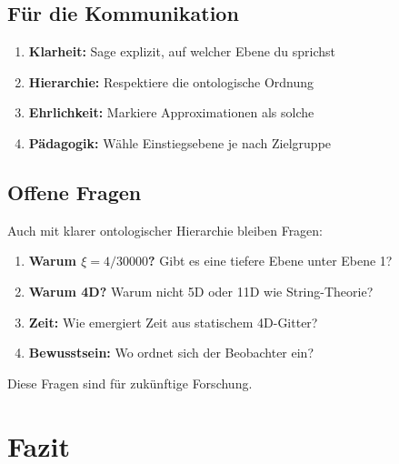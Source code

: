	\subsection{Für die Kommunikation}
	
	\begin{enumerate}
		\item \textbf{Klarheit:} Sage explizit, auf welcher Ebene du sprichst
		\item \textbf{Hierarchie:} Respektiere die ontologische Ordnung
		\item \textbf{Ehrlichkeit:} Markiere Approximationen als solche
		\item \textbf{Pädagogik:} Wähle Einstiegsebene je nach Zielgruppe
	\end{enumerate}
	
	\subsection{Offene Fragen}
	
	\begin{question}
		Auch mit klarer ontologischer Hierarchie bleiben Fragen:
		
		\begin{enumerate}
			\item \textbf{Warum $\xi = 4/30000$?} Gibt es eine tiefere Ebene unter Ebene 1?
			\item \textbf{Warum 4D?} Warum nicht 5D oder 11D wie String-Theorie?
			\item \textbf{Zeit:} Wie emergiert Zeit aus statischem 4D-Gitter?
			\item \textbf{Bewusstsein:} Wo ordnet sich der Beobachter ein?
		\end{enumerate}
		
		Diese Fragen sind für zukünftige Forschung.
	\end{question}
	
	\section{Fazit}
	

